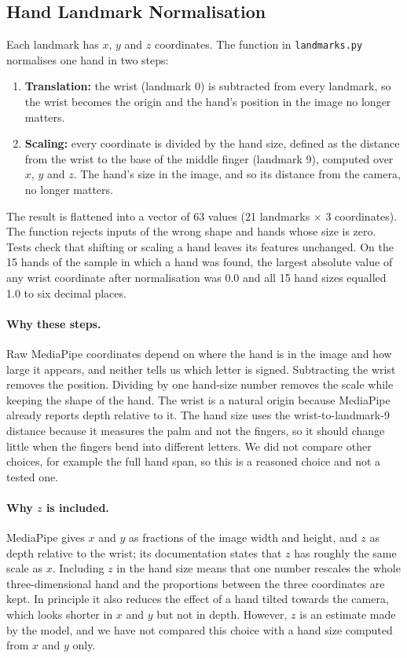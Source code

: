 \subsection{Hand Landmark Normalisation}

Each landmark has $x$, $y$ and $z$ coordinates. The function in \texttt{landmarks.py} normalises one hand in two steps:
\begin{enumerate}
  \item \textbf{Translation:} the wrist (landmark 0) is subtracted from every landmark, so the wrist becomes the origin and the hand's position in the image no longer matters.
  \item \textbf{Scaling:} every coordinate is divided by the hand size, defined as the distance from the wrist to the base of the middle finger (landmark 9), computed over $x$, $y$ and $z$. The hand's size in the image, and so its distance from the camera, no longer matters.
\end{enumerate}
The result is flattened into a vector of 63 values (21 landmarks $\times$ 3 coordinates). The function rejects inputs of the wrong shape and hands whose size is zero. Tests check that shifting or scaling a hand leaves its features unchanged. On the 15 hands of the sample in which a hand was found, the largest absolute value of any wrist coordinate after normalisation was 0.0 and all 15 hand sizes equalled 1.0 to six decimal places.

\paragraph{Why these steps.} Raw MediaPipe coordinates depend on where the hand is in the image and how large it appears, and neither tells us which letter is signed. Subtracting the wrist removes the position. Dividing by one hand-size number removes the scale while keeping the shape of the hand. The wrist is a natural origin because MediaPipe already reports depth relative to it. The hand size uses the wrist-to-landmark-9 distance because it measures the palm and not the fingers, so it should change little when the fingers bend into different letters. We did not compare other choices, for example the full hand span, so this is a reasoned choice and not a tested one.

\paragraph{Why $z$ is included.} MediaPipe gives $x$ and $y$ as fractions of the image width and height, and $z$ as depth relative to the wrist; its documentation states that $z$ has roughly the same scale as $x$. Including $z$ in the hand size means that one number rescales the whole three-dimensional hand and the proportions between the three coordinates are kept. In principle it also reduces the effect of a hand tilted towards the camera, which looks shorter in $x$ and $y$ but not in depth. However, $z$ is an estimate made by the model, and we have not compared this choice with a hand size computed from $x$ and $y$ only.


